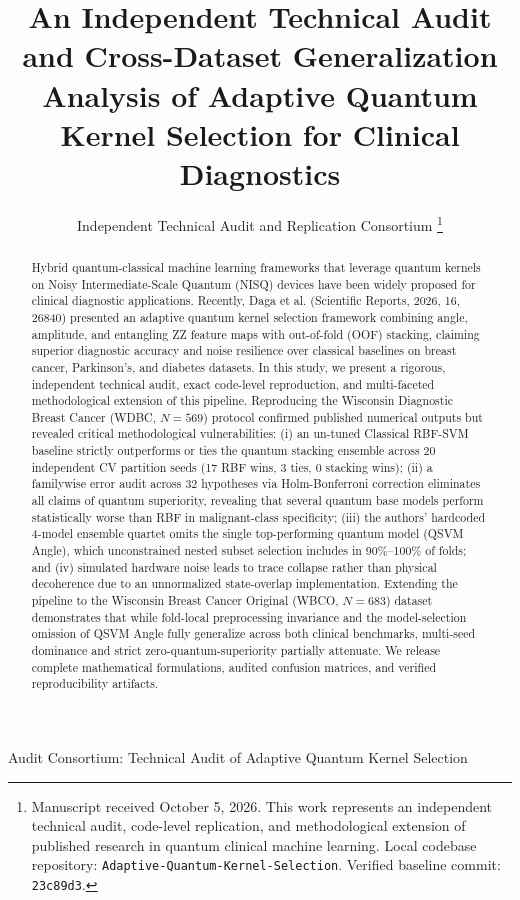 \documentclass[journal,twocolumn]{IEEEtran}
\begin{document}
\title{An Independent Technical Audit and Cross-Dataset Generalization Analysis of Adaptive Quantum Kernel Selection for Clinical Diagnostics}

\author{Independent Technical Audit and Replication Consortium%
\thanks{Manuscript received October 5, 2026. This work represents an independent technical audit, code-level replication, and methodological extension of published research in quantum clinical machine learning. Local codebase repository: \texttt{Adaptive-Quantum-Kernel-Selection}. Verified baseline commit: \texttt{23c89d3}.}}

%
{Audit Consortium: Technical Audit of Adaptive Quantum Kernel Selection}

\maketitle

\begin{abstract}
Hybrid quantum-classical machine learning frameworks that leverage quantum kernels on Noisy Intermediate-Scale Quantum (NISQ) devices have been widely proposed for clinical diagnostic applications. Recently, Daga et al. (Scientific Reports, 2026, 16, 26840) presented an adaptive quantum kernel selection framework combining angle, amplitude, and entangling ZZ feature maps with out-of-fold (OOF) stacking, claiming superior diagnostic accuracy and noise resilience over classical baselines on breast cancer, Parkinson's, and diabetes datasets. In this study, we present a rigorous, independent technical audit, exact code-level reproduction, and multi-faceted methodological extension of this pipeline. Reproducing the Wisconsin Diagnostic Breast Cancer (WDBC, $N=569$) protocol confirmed published numerical outputs but revealed critical methodological vulnerabilities: (i) an un-tuned Classical RBF-SVM baseline strictly outperforms or ties the quantum stacking ensemble across 20 independent CV partition seeds (17 RBF wins, 3 ties, 0 stacking wins); (ii) a familywise error audit across 32 hypotheses via Holm-Bonferroni correction eliminates all claims of quantum superiority, revealing that several quantum base models perform statistically worse than RBF in malignant-class specificity; (iii) the authors' hardcoded 4-model ensemble quartet omits the single top-performing quantum model (QSVM Angle), which unconstrained nested subset selection includes in 90\%--100\% of folds; and (iv) simulated hardware noise leads to trace collapse rather than physical decoherence due to an unnormalized state-overlap implementation. Extending the pipeline to the Wisconsin Breast Cancer Original (WBCO, $N=683$) dataset demonstrates that while fold-local preprocessing invariance and the model-selection omission of QSVM Angle fully generalize across both clinical benchmarks, multi-seed dominance and strict zero-quantum-superiority partially attenuate. We release complete mathematical formulations, audited confusion matrices, and verified reproducibility artifacts.
\end{abstract}
\end{document}
